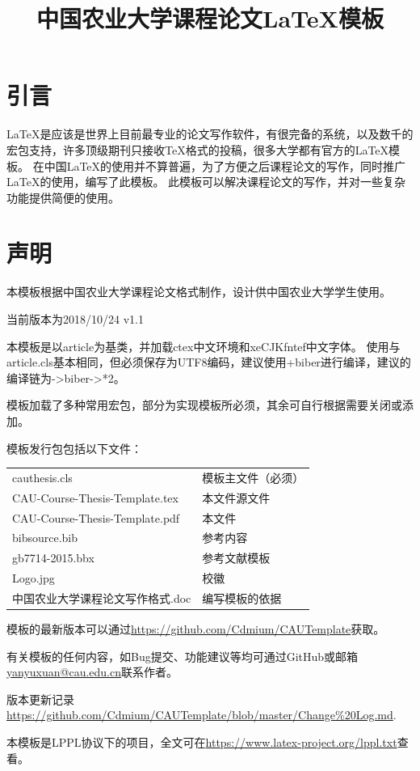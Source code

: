 \documentclass[twoside,maketable]{cauthesis}
\title{中国农业大学课程论文\LaTeX{}模板}%
\date{}%
\author{}%
\begin{document}
    \section{引言}
    \LaTeX{}是应该是世界上目前最专业的论文写作软件，有很完备的系统，以及数千的宏包支持，许多顶级期刊只接收\TeX{}格式的投稿，很多大学都有官方的\LaTeX{}模板。
    在中国\LaTeX{}的使用并不算普遍，为了方便之后课程论文的写作，同时推广\LaTeX{}的使用，编写了此模板。
    此模板可以解决课程论文的写作，并对一些复杂功能提供简便的使用。
    \section{声明}
    本模板根据中国农业大学课程论文格式制作，设计供中国农业大学学生使用。

    当前版本为2018/10/24 v1.1

    本模板是以article为基类，并加载ctex中文环境和xeCJKfntef中文字体。
    使用与article.cls基本相同，但必须保存为UTF8编码，建议使用\XeLaTeX{}+biber进行编译，建议的编译链为\XeLaTeX{}->biber->\XeLaTeX{}*2。

    模板加载了多种常用宏包，部分为实现模板所必须，其余可自行根据需要关闭或添加。

    模板发行包包括以下文件：

    \begin{table}[H]
        \begin{tabular}{ll}
            cauthesis.cls&模板主文件（必须）\\
            CAU-Course-Thesis-Template.tex&本文件源文件\\
            CAU-Course-Thesis-Template.pdf&本文件\\
            bibsource.bib&参考内容\\
            gb7714-2015.bbx&参考文献模板\\
            Logo.jpg&校徽\\
            中国农业大学课程论文写作格式.doc&编写模板的依据
        \end{tabular}
    \end{table}
    
    模板的最新版本可以通过\url{https://github.com/Cdmium/CAUTemplate}获取。

    有关模板的任何内容，如Bug提交、功能建议等均可通过GitHub或邮箱\url{yanyuxuan@cau.edu.cn}联系作者。
    
    版本更新记录\url{https://github.com/Cdmium/CAUTemplate/blob/master/Change%20Log.md}.

    本模板是LPPL协议下的项目，全文可在\url{https://www.latex-project.org/lppl.txt}查看。
\end{document}
